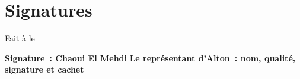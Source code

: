 \needspace{6cm}
\section*{Signatures}

\noindent Fait à \makebox[4cm]{\dotfill} le \makebox[3cm]{\dotfill}

\vspace{6pt}
\noindent\textbf{Signature~: Chaoui El Mehdi} \hfill \textbf{Le représentant d'Alton~: nom, qualité, signature et cachet}

\vspace{2cm}\mbox{}
